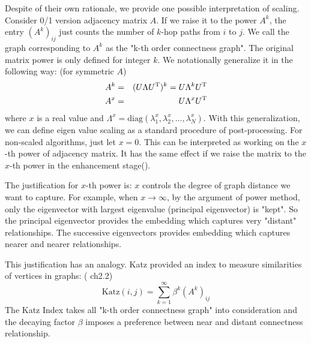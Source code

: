 Despite of their own rationale, we provide one possible interpretation 
of scaling. Consider 0/1 version adjacency matrix $ A $. If we raise it to the power
$ A^k $, the entry $ (A^k)_{ij} $ just counts the number of $ k $-hop paths 
from $ i $ to $ j $. 
We call the graph corresponding to $ A^k $ as the "k-th order connectness graph". 
The original matrix power is only defined for 
integer $ k $. We notationally generalize it in the following way:
(for symmetric $ A $)
\begin{eqnarray}
	A^k &=& (U \Lambda U^\mathrm{T})^k = U \Lambda^k U^\mathrm{T} \\
	A^x &=& U \Lambda^x U^\mathrm{T} 
\end{eqnarray}
where $ x $ is a real value and 
$ \Lambda^x = \text{diag}(\lambda_1^x, \lambda_2^x, \ldots, \lambda_N^x) $. 
With this generalization, we can define eigen value scaling as 
a standard procedure of post-processing. For non-scaled algorithms, 
just let $ x=0 $. This can be interpreted as working on the $ x $-th
power of adjacency matrix. It has the same effect if we raise the matrix
to the $ x $-th power in the enhancement stage(\rsec{\ref{sec:enhance}}). 

The justification for $ x $-th power is: $ x $ controls the degree
of graph distance we want to capture. For example, when $ x \rightarrow \infty $, 
by the argument of power method, only the eigenvector with largest eigenvalue 
(principal eigenvector) is "kept". So the principal eigenvector provides 
the embedding which captures very "distant" relationships. The successive 
eigenvectors provides embedding which captures nearer and nearer relationships. 

This justification has an analogy. Katz\cite{katz1953catzindex}
provided an index to measure similarities of vertices in graphs:
(\cite{aggarwal2011social} ch2.2)
\begin{equation}
	\text{Katz}(i,j) = \sum_{k=1}^{\infty}{\beta^k (A^k)_{ij}}
	\label{eq:katz}
\end{equation}
The Katz Index takes all "k-th order connectness graph" into consideration
and the decaying factor $ \beta $ imposes 
a preference between near and distant connectness
relationship. 

